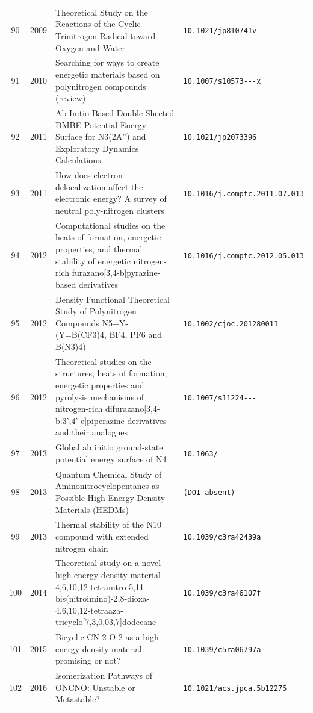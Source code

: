 {\begin{longtable}{@{}cp{1.0cm}p{8.4cm}p{4.2cm}@{}}
90 & 2009 & Theoretical Study on the Reactions of the Cyclic Trinitrogen Radical toward Oxygen and Water & \texttt{10.1021/\allowbreak jp810741v} \\
91 & 2010 & Searching for ways to create energetic materials based on polynitrogen compounds (review) & \texttt{10.1007/\allowbreak s10573-\allowbreak 010-\allowbreak 0020-\allowbreak x} \\
92 & 2011 & Ab Initio Based Double-Sheeted DMBE Potential Energy Surface for N3(2A'') and Exploratory Dynamics Calculations & \texttt{10.1021/\allowbreak jp2073396} \\
93 & 2011 & How does electron delocalization affect the electronic energy? A survey of neutral poly-nitrogen clusters & \texttt{10.1016/\allowbreak j.comptc.2011.07.013} \\
94 & 2012 & Computational studies on the heats of formation, energetic properties, and thermal stability of energetic nitrogen-rich furazano[3,4-b]pyrazine-based derivatives & \texttt{10.1016/\allowbreak j.comptc.2012.05.013} \\
95 & 2012 & Density Functional Theoretical Study of Polynitrogen Compounds N5+Y- (Y=B(CF3)4, BF4, PF6 and B(N3)4) & \texttt{10.1002/\allowbreak cjoc.201280011} \\
96 & 2012 & Theoretical studies on the structures, heats of formation, energetic properties and pyrolysis mechanisms of nitrogen-rich difurazano[3,4-b:3',4'-e]piperazine derivatives and their analogues & \texttt{10.1007/\allowbreak s11224-\allowbreak 012-\allowbreak 0133-\allowbreak 9} \\
97 & 2013 & Global ab initio ground-state potential energy surface of N4 & \texttt{10.1063/\allowbreak 1.4811653} \\
98 & 2013 & Quantum Chemical Study of Aminonitrocyclopentanes as Possible High Energy Density Materials (HEDMs) & \texttt{(DOI absent)} \\
99 & 2013 & Thermal stability of the N10 compound with extended nitrogen chain & \texttt{10.1039/\allowbreak c3ra42439a} \\
100 & 2014 & Theoretical study on a novel high-energy density material 4,6,10,12-tetranitro-5,11-bis(nitroimino)-2,8-dioxa-4,6,10,12-tetraaza-tricyclo[7,3,0,03,7]dodecane & \texttt{10.1039/\allowbreak c3ra46107f} \\
101 & 2015 & Bicyclic CN 2 O 2 as a high-energy density material: promising or not? & \texttt{10.1039/\allowbreak c5ra06797a} \\
102 & 2016 & Isomerization Pathways of ONCNO: Unstable or Metastable? & \texttt{10.1021/\allowbreak acs.jpca.5b12275} \\

\end{longtable}}
